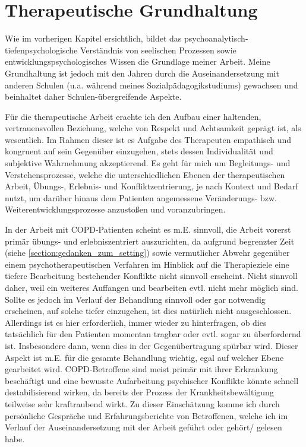 \section{Therapeutische Grundhaltung} 
Wie im vorherigen Kapitel ersichtlich, bildet das psychoanalytisch-tiefenpsychologische Verständnis von seelischen Prozessen sowie entwicklungspsychologisches Wissen die Grundlage meiner Arbeit. Meine Grundhaltung ist jedoch mit den Jahren durch die Auseinandersetzung mit anderen Schulen (u.a. während meines Sozialpädagogikstudiums) gewachsen und beinhaltet daher Schulen-übergreifende Aspekte. 

Für die therapeutische Arbeit erachte ich den Aufbau einer haltenden, vertrauensvollen Beziehung, welche von Respekt und Achtsamkeit geprägt ist, als wesentlich. 
Im Rahmen dieser ist es Aufgabe des Therapeuten empathisch und kongruent auf sein Gegenüber einzugehen, stets dessen Individualität und subjektive Wahrnehmung akzeptierend. 
Es geht für mich um Begleitungs- und Verstehensprozesse, welche die unterschiedlichen Ebenen der therapeutischen Arbeit, Übungs-, Erlebnis- und Konfliktzentrierung, je nach Kontext und Bedarf nutzt, um darüber hinaus dem Patienten angemessene Veränderungs- bzw. Weiterentwicklungsprozesse anzustoßen und voranzubringen. 

In der Arbeit mit COPD-Patienten scheint es m.E. sinnvoll, die Arbeit vorerst primär übungs- und erlebniszentriert auszurichten, da aufgrund begrenzter Zeit (siehe \ref{section:gedanken_zum_setting}) sowie vermutlicher Abwehr gegenüber einem psychotherapeutischen Verfahren im Hinblick auf die Therapieziele eine tiefere Bearbeitung bestehender Konflikte nicht sinnvoll erscheint. Nicht sinnvoll daher, weil ein weiteres Auffangen und bearbeiten evtl. nicht mehr möglich sind. Sollte es jedoch im Verlauf der Behandlung sinnvoll oder gar notwendig erscheinen, auf solche tiefer einzugehen, ist dies natürlich nicht ausgeschlossen. Allerdings ist es hier erforderlich, immer wieder zu hinterfragen, ob dies tatsächlich für den Patienten momentan tragbar oder evtl. sogar zu überfordernd ist. Insbesondere dann, wenn dies in der Gegenübertragung spürbar wird. Dieser Aspekt ist m.E. für die gesamte Behandlung wichtig, egal auf welcher Ebene gearbeitet wird. COPD-Betroffene sind meist primär mit ihrer Erkrankung beschäftigt und eine bewusste Aufarbeitung psychischer Konflikte könnte schnell destabilisierend wirken, da bereits der Prozess der Krankheitsbewältigung teilweise sehr kraftraubend wirkt. Zu dieser Einschätzung komme ich durch persönliche Gespräche und Erfahrungsberichte von Betroffenen, welche ich im Verlauf der Auseinandersetzung mit der Arbeit geführt oder gehört/ gelesen habe. 

